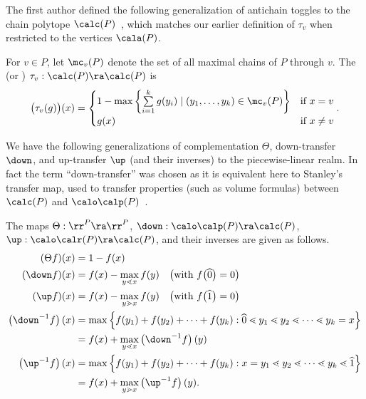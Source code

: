 The first author defined the following generalization of antichain toggles to the chain
polytope $\calc(P)$~\cite[\S~3]{antichain-toggling}, which matches our earlier definition
of $\tau_v$ when restricted to the vertices $\cala(P)$. 

\begin{defi}\label{def:PL-ant-tog}
For $v\in P$, let $\mc_v(P)$ denote the set of all maximal chains of $P$ through $v$.
The 
(or ) $\tau_v:\calc(P)\ra \calc(P)$ is
\[
\big(\tau_v(g)\big)(x) =
\begin{cases}
1-\max\left\{ %
\sum\limits_{i=1}^k g(y_i) %
\mid (y_1,\dots,y_k)\in \mc_v(P) \right\}
&\text{if }x=v\\
g(x) &\text{if }x\not=v
\end{cases}.
\]
\end{defi}

We have the following generalizations of complementation $\Theta$,
down-transfer $\down$, and up-transfer $\up$ (and their inverses)
to the piecewise-linear realm.
In fact the term ``down-transfer'' was chosen as it is equivalent here to
Stanley's transfer map, used to transfer properties (such as volume formulas) between $\calc(P)$
and $\calo\calp(P)$~\cite{Sta86}.

\begin{defi}
The maps $\Theta: \rr^P \ra \rr^P$, $\down: \calo\calp(P) \ra \calc(P)$,
$\up: \calo\calr(P) \ra \calc(P)$, and their inverses are given as follows.
\begin{align*}
 (\Theta f)(x) &= 1-f(x)\\
 (\down f)(x) &= f(x)-{\max\limits_{y\lessdot x} f(y)} \quad \big(\text{with } f\big(\widehat{0}\big)=0\big)\\
 (\up f)(x) &= 
 f(x) - {\max\limits_{y\gtrdot x} f(y)} \quad \big(\text{with } f\big(\widehat{1}\big)=0\big)\\
 \left(\down^{-1}f\right)(x) &=
 \max\left\{ f(y_1)+f(y_2)+\cdots +f(y_k):
 \widehat{0}\lessdot y_1\lessdot y_2 \lessdot \cdots \lessdot y_k=x \right\}\\
 &=f(x)+ \max\limits_{y\lessdot x}\left(\down^{-1}f\right)(y)\\
 \left(\up^{-1}f\right)(x) &=
 \max\left\{ f(y_1)+ f(y_2)+\cdots +f(y_k):x=y_1
\lessdot y_2\lessdot \cdots \lessdot y_k\lessdot \widehat{1}\right\}\\
 &=f(x)+ \max\limits_{y\gtrdot x}\left(\up^{-1}f\right)(y).
\end{align*}
\end{defi}


